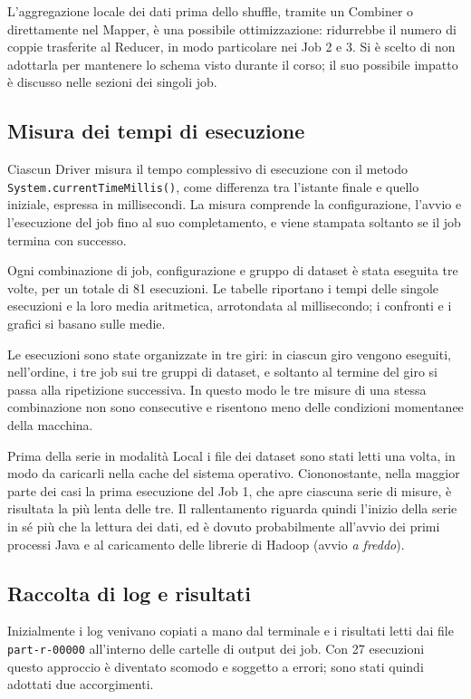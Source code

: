 \documentclass[12pt, a4paper]{article}
\begin{document}
L'aggregazione locale dei dati prima dello shuffle,
tramite un Combiner o direttamente nel Mapper,
è una possibile ottimizzazione: ridurrebbe il numero
di coppie trasferite al Reducer, in modo particolare
nei Job 2 e 3. Si è scelto di non adottarla per mantenere
lo schema visto durante il corso; il suo possibile impatto
è discusso nelle sezioni dei singoli job.

\subsection{Misura dei tempi di esecuzione}
\label{sec:tempi}

Ciascun Driver misura il tempo complessivo di esecuzione
con il metodo \texttt{System.\allowbreak currentTimeMillis()},
come differenza tra l'istante finale e quello iniziale,
espressa in millisecondi.
La misura comprende la configurazione, l'avvio
e l'esecuzione del job fino al suo completamento,
e viene stampata soltanto se il job termina con successo.

Ogni combinazione di job, configurazione e gruppo
di dataset è stata eseguita tre volte, per un totale
di 81 esecuzioni. Le tabelle riportano i tempi
delle singole esecuzioni e la loro media aritmetica,
arrotondata al millisecondo; i confronti e i grafici
si basano sulle medie.

Le esecuzioni sono state organizzate in tre giri:
in ciascun giro vengono eseguiti, nell'ordine, i tre job
sui tre gruppi di dataset, e soltanto al termine
del giro si passa alla ripetizione successiva.
In questo modo le tre misure di una stessa combinazione
non sono consecutive e risentono meno delle condizioni
momentanee della macchina.

Prima della serie in modalità Local i file dei dataset
sono stati letti una volta, in modo da caricarli
nella cache del sistema operativo.
Ciononostante, nella maggior parte dei casi la prima
esecuzione del Job 1, che apre ciascuna serie di misure,
è risultata la più lenta delle tre. Il rallentamento
riguarda quindi l'inizio della serie in sé più che
la lettura dei dati, ed è dovuto probabilmente
all'avvio dei primi processi Java e al caricamento
delle librerie di Hadoop (avvio \textit{a freddo}).

\subsection{Raccolta di log e risultati}

Inizialmente i log venivano copiati a mano dal terminale
e i risultati letti dai file \texttt{part-r-00000}
all'interno delle cartelle di output dei job.
Con 27 esecuzioni questo approccio è diventato scomodo
e soggetto a errori; sono stati quindi adottati
due accorgimenti.
\end{document}
